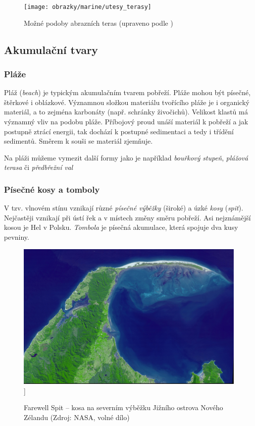 \begin{figure}[h]
	\centering
	\texttt{[image: obrazky/marine/utesy\_terasy]}
	\caption{Možné podoby abrazních teras (upraveno podle \textcite{birdCoastalGeomorphologyIntroduction2008})}
	\label{fig:abrazni_terasa}
\end{figure}



\subsection{Akumulační tvary}
\subsubsection{Pláže}
Pláž (\textit{beach}) je typickým akumulačním tvarem pobřeží. Pláže mohou být písečné, štěrkové i oblázkové. Významnou složkou materiálu tvořícího pláže je i organický materiál, a to zejména karbonáty (např. schránky živočichů). Velikost klastů má významný vliv na podobu pláže. Příbojový proud unáší materiál k pobřeží a jak postupně ztrácí energii, tak dochází k postupné sedimentaci a tedy i třídění sedimentů. Směrem k souši se materiál zjemňuje. 

Na pláži můžeme vymezit další formy jako je například \emph{bouřkový stupeň}, \emph{plážová terasa} či \emph{předbřežní val}

\subsubsection{Písečné kosy a tomboly}
V tzv. vlnovém stínu vznikají různé \emph{písečné výběžky} (široké) a úzké \emph{kosy} (\textit{spit}). Nejčastěji vznikají při ústí řek a v místech změny směru pobřeží. Asi nejznámější kosou je Hel v Polsku.
\emph{Tombola} je písečná akumulace, která spojuje dva kusy pevniny.

\begin{figure}[h]
	\centering
	\includegraphics[width=1\linewidth]{obrazky/marine/kosa}]
	\caption{Farewell Spit -- kosa na severním výběžku Jižního ostrova Nového Zélandu (Zdroj: NASA, volné dílo)}
	\label{fig:kosa}
\end{figure}

